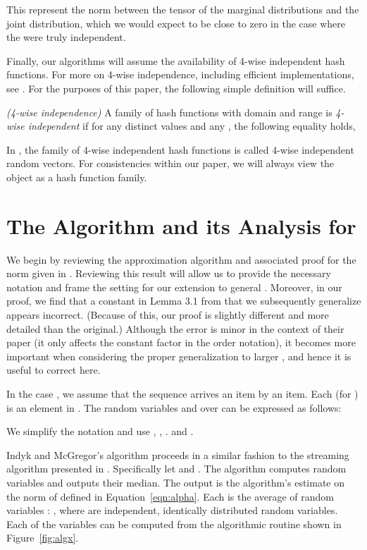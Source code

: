 \def\draft{0}  \documentclass[proceedings]{stacs}
\theoremstyle{plain}\newtheorem{satz}[thm]{Satz}
\theoremstyle{definition}\newtheorem{crucial}[thm]{Crucial Definition}
\begin{document}
This represent the  norm between the tensor of the marginal distributions and the joint distribution,
which we would expect to be close to zero in the case where the  were truly independent.

Finally, our algorithms will assume the availability of 4-wise independent hash functions.
For more on 4-wise independence, including efficient implementations, see \cite{BCH, TZ04}.
For the purposes of this paper, the following simple definition will suffice.

\begin{definition}\emph{(4-wise independence)}
A family of hash functions  with domain  and range  is \emph{4-wise independent} if for any distinct values
 and any , the following equality holds,

\end{definition}
\begin{remark}In \cite{IM08}, the family of 4-wise independent hash functions  is called 4-wise independent random vectors. For consistencies within our paper, we will always view the object  as a hash function family.
\end{remark}

\section{The Algorithm and its Analysis for } \label{sec:kis2}
We begin by reviewing the approximation algorithm and associated proof
for the  norm given in \cite{IM08}. Reviewing this result
will allow us to provide the necessary notation and frame the setting
for our extension to general .  Moreover, in our proof, we find
that a constant in Lemma 3.1 from \cite{IM08} that we subsequently
generalize appears incorrect.  (Because of this, our proof is slightly
different and more detailed than the original.)  Although the error is
minor in the context of their paper (it only affects the constant
factor in the order notation), it becomes more important when
considering the proper generalization to larger , and hence it
is useful to correct here.


In the case , we assume that the sequence  arrives an item by an item.
Each  (for ) is an element in . The random variables  and  over  can be expressed
as follows:

We simplify the notation and use
, ,
.
and
.

Indyk and McGregor's algorithm proceeds in a similar fashion
to the streaming algorithm presented in \cite{ams}. Specifically let  and .
The algorithm computes  random variables  and
outputs their median. The output is the algorithm's estimate on the norm of  defined in Equation~\ref{eqn:alpha}.
Each  is the average of  random variables : , where  are independent, identically
distributed random variables. Each of the variables  can be computed from the algorithmic routine shown in
Figure~\ref{fig:algx}.
\end{document}
